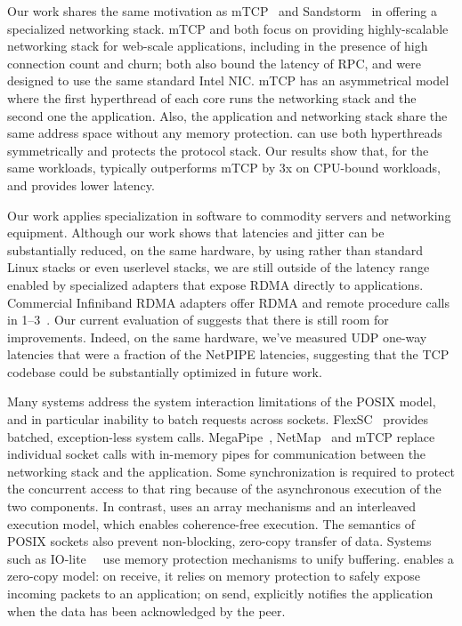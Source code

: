  Our work shares the same
motivation as mTCP~\cite{jeong2014mtcp} and
Sandstorm~\cite{marinos2013network} in offering a specialized
networking stack.  mTCP and \ix both focus on
providing highly-scalable
networking stack for web-scale applications, including in the presence
of high connection count and churn; both also bound the
latency of RPC, and were designed to use the same standard Intel NIC.
mTCP has an asymmetrical model where the first hyperthread of each
core runs the networking stack and the second one the application.
Also, the application and networking stack share the same address
space without any memory protection.  \ix can use both hyperthreads symmetrically
and protects the protocol stack.   Our results show
that, for the same workloads, \ix typically outperforms mTCP by 3x on
CPU-bound workloads, and provides lower latency.
 

 Our work applies
specialization in software to commodity servers and networking
equipment.  Although our work shows that latencies and jitter can be
substantially reduced, on the same hardware, by using \ix rather than
standard Linux stacks or even userlevel stacks, we are still outside
of the latency range enabled by specialized adapters that expose RDMA
directly to applications.  Commercial Infiniband RDMA adapters offer
RDMA and remote procedure calls in
\mbox{1--3}\microsecond~\cite{DBLP:conf/sosp/OngaroRSOR11,Jose:2011:MDH,mitchell:rdma,dragojevic14farm}.
Our current evaluation of \ix suggests that there is still room for
improvements.  Indeed, on the same hardware, we've measured UDP
one-way latencies that were a fraction of the NetPIPE latencies,
suggesting that the TCP codebase could be substantially optimized in
future work. 

 Many systems
address the system interaction limitations of the POSIX model, and in
particular inability to batch requests across sockets.
FlexSC~\cite{soares2010flexsc} provides batched, exception-less system
calls.  MegaPipe~\cite{han2012megapipe}, NetMap~\cite{rizzo2012netmap}
and mTCP replace individual socket calls with in-memory pipes for
communication between the networking stack and the application.  Some
synchronization is required to protect the concurrent access to that
ring because of the asynchronous execution of the two components.  In
contrast, \ix uses an array mechanisms and an interleaved execution
model, which enables coherence-free execution.  The semantics of POSIX
sockets also prevent non-blocking, zero-copy transfer of data. Systems
such as IO-lite~~\cite{DBLP:journals/tocs/PaiDZ00} use memory
protection mechanisms to unify buffering.  \ix enables a zero-copy
model: on receive, it relies on memory protection to safely expose
incoming packets to an application; on send, \ix explicitly notifies the
application when the data has been acknowledged by the peer.



